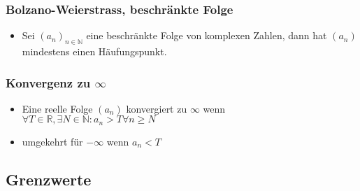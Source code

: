 \documentclass[a3paper, 11pt, landscape]{scrartcl}
\begin{document}
\begin{multicols*}{3}
        \subsubsection{Bolzano-Weierstrass, beschränkte Folge}
        \begin{itemize}
            \item Sei $(a_n)_{n\in\mathbb{N}}$ eine beschränkte Folge von komplexen Zahlen, dann hat $(a_n)$ mindestens einen Häufungspunkt.
        \end{itemize}
        
        \subsubsection{Konvergenz zu $\infty$}
        \begin{itemize}
            \item Eine reelle Folge $(a_n)$ konvergiert zu $\infty$ wenn $\forall T \in \mathbb{R}, \exists N \in \mathbb{N}: a_n > T \forall n \geq N$
            \item umgekehrt für $-\infty$ wenn $a_n<T$
        \end{itemize}

		\subsection{Grenzwerte}

\end{multicols*}
\end{document}

